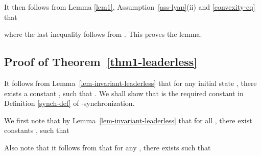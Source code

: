 \documentclass[a4paper, 11pt]{article}
\begin{document}
It then follows from Lemma \ref{lem1}, Assumption~\ref{ass-lyap}(ii) and \eqref{convexity-eq} that

where the last inequality follows from . This proves the lemma.


\subsection{Proof of Theorem~\ref{thm1-leaderless}}\label{proof-thm1-leaderless}
It follows from Lemma~\ref{lem-invariant-leaderless} that for any initial state ,
there exists a constant , such that . We shall show that  is the required constant in Definition \ref{synch-def} of -synchronization.

We first note that by Lemma~\ref{lem-invariant-leaderless} that for all , there exist constants ,
such that

Also note that it follows from  that for any , there exists  such that
\end{document}
